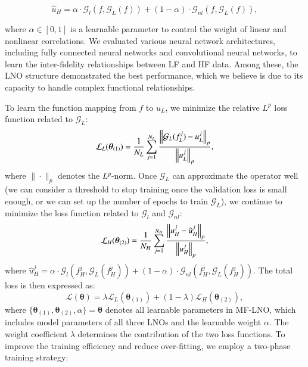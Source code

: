 \begin{equation}\label{eq:alpha}
\hat u_H  =  \alpha \cdot \mathcal{G}_{l}(f, \mathcal{G}_{L}(f))  +  (1 - \alpha) \cdot \mathcal{G}_{nl}(f, \mathcal{G}_{L}(f)),
\end{equation}

where $\alpha \in [0, 1]$ is a learnable parameter to control the weight of linear and nonlinear correlations. We evaluated various neural network architectures, including fully connected neural networks and convolutional neural networks, to learn the inter-fidelity relationships between LF and HF data. Among these, the LNO structure demonstrated the best performance, which we believe is due to its capacity to handle complex functional relationships.

To learn the function mapping from $f$ to $u_L$, we minimize the relative $L^p$ loss function related to $\mathcal{G}_{L}$:
\begin{equation}\label{eq:loss1}
   \mathcal{L}_L({\boldsymbol{\theta}}_{(1)})  =  \frac{1}{N_L}\sum_{j=1}^{N_L} \frac{\Bigl\|\mathcal{G}_{L}(f_L^j) - u_L^j\Bigr\|_p}{\Bigl\|u_L^j\Bigr\|_p},
\end{equation}
where $\|\cdot\|_p$ denotes the $L{^p}$-norm. Once $\mathcal{G}_{L}$ can approximate the operator well (we can consider a threshold to stop training once the validation loss is small enough, or we can set up the number of epochs to train $\mathcal{G}_{L}$), we continue to minimize the loss function related to $\mathcal{G}_{l}$ and $\mathcal{G}_{nl}$:
\begin{equation}\label{eq:loss2}
   \mathcal{L}_H({\boldsymbol{\theta}}_{(2)})  =  \frac{1}{N_H}\sum_{j=1}^{N_H} \frac{\Bigl\| u_H^j - \hat u_H^j \Bigr\|_p}{\Bigl\| u_H^j \Bigr\|_p} ,
\end{equation}
where $\hat u_H^j = \alpha \cdot \mathcal{G}_{l}\left(f_H^j, \mathcal{G}_{L}(f_H^j)\right) + (1-\alpha) \cdot \mathcal{G}_{nl}\left(f_H^j, \mathcal{G}_{L}(f_H^j)\right) $. The total loss is then expressed as:
\begin{equation}\label{eq:loss3}
\mathcal{L}({\boldsymbol{\theta}})  =  \lambda\mathcal{L}_L({\boldsymbol{\theta}}_{(1)}) + (1-\lambda)\mathcal{L}_H({\boldsymbol{\theta}}_{(2)}),
\end{equation}
where $\{{\boldsymbol{\theta}}_{(1)}, {\boldsymbol{\theta}}_{(2)}, \alpha\}={\boldsymbol{\theta}}$ denotes all learnable parameters in MF-LNO, which includes model parameters of all three LNOs and the learnable weight $\alpha$. The weight coefficient $\lambda$ determines the contribution of the two loss functions. To improve the training efficiency and reduce over-fitting, we employ a two-phase training strategy: 

